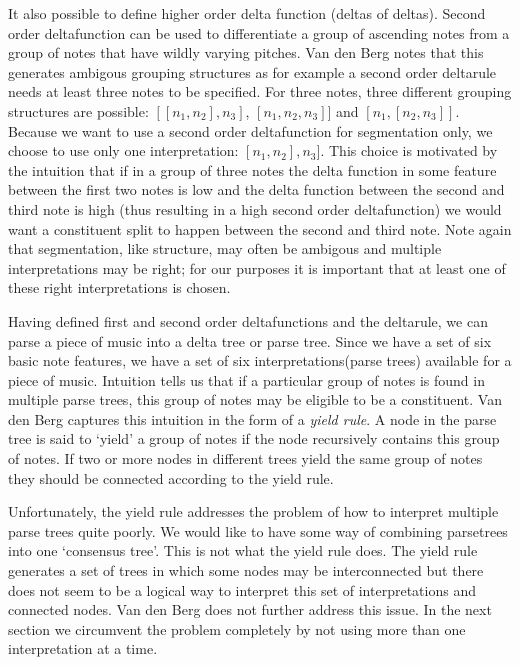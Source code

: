 \documentclass[a4paper,10pt]{article}
\begin{document}
It also possible to define higher order delta function (deltas of deltas). Second order deltafunction can be used to differentiate a group of ascending notes from a group of notes that have wildly varying pitches. Van den Berg notes that this generates ambigous grouping structures as for example a second order deltarule needs at least three notes to be specified. For three notes, three different grouping structures are possible: $[[n_1, n_2], n_3]$, $[n_1, n_2, n_3]]$ and $[n_1, [n_2, n_3]]$. Because we want to use a second order deltafunction for segmentation only, we choose to use only one interpretation: $[n_1, n_2], n_3]$. This choice is motivated by the intuition that if in a group of three notes the delta function in some feature between the first two notes is low and the delta function between the second and third note is high (thus resulting in a high second order deltafunction) we would want a constituent split to happen between the second and third note. Note again that segmentation, like structure, may often be ambigous and multiple interpretations may be right; for our purposes it is important that at least one of these right interpretations is chosen. 

Having defined first and second order deltafunctions and the deltarule, we can parse a piece of music into a delta tree or parse tree. Since we have a set of six basic note features, we have a set of six interpretations(parse trees) available for a piece of music. Intuition tells us that if a particular group of notes is found in multiple parse trees, this group of notes may be eligible to be a constituent. Van den Berg captures this intuition in the form of a \textit{yield rule}. A node in the parse tree is said to `yield' a group of notes if the node recursively contains this group of notes. If two or more nodes in different trees yield the same group of notes they should be connected according to the yield rule.

Unfortunately, the yield rule addresses the problem of how to interpret multiple parse trees quite poorly. We would like to have some way of combining parsetrees into one `consensus tree'. This is not what the yield rule does. The yield rule generates a set of trees in which some nodes may be interconnected but there does not seem to be a logical way to interpret this set of interpretations and connected nodes. Van den Berg does not further address this issue. In the next section we circumvent the problem completely by not using more than one interpretation at a time.
\end{document}
